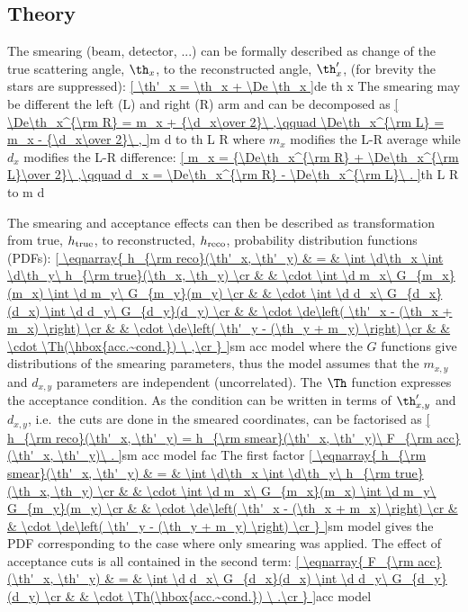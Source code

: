 \subsection{Theory}

\vskip3mm

The smearing (beam, detector, ...) can be formally described as change of the true scattering angle, $\th_x$, to the reconstructed angle, $\th'_x$, (for brevity the stars are suppressed):
\eqref{
\th'_x = \th_x + \De \th_x
}{de th x}
The smearing may be different the left (L) and right (R) arm and can be decomposed as
\eqref{
\De\th_x^{\rm R} = m_x + {\d_x\over 2}\ ,\qquad \De\th_x^{\rm L} = m_x - {\d_x\over 2}\ ,
}{m d to th L R}
where $m_x$ modifies the L-R average while $d_x$ modifies the L-R difference:
\eqref{
m_x = {\De\th_x^{\rm R} + \De\th_x^{\rm L}\over 2}\ ,\qquad d_x = \De\th_x^{\rm R} - \De\th_x^{\rm L}\ .
}{th L R to m d}

The smearing and acceptance effects can then be described as transformation from true, $h_{\rm true}$, to reconstructed, $h_{\rm reco}$, probability distribution functions (PDFs):
\eqref{
\eqnarray{
	h_{\rm reco}(\th'_x, \th'_y) & = & \int \d\th_x \int \d\th_y\ h_{\rm true}(\th_x, \th_y) \cr
								 &  & \cdot \int \d m_x\ G_{m_x}(m_x) \int \d m_y\ G_{m_y}(m_y) \cr
								 &  & \cdot \int \d d_x\ G_{d_x}(d_x) \int \d d_y\ G_{d_y}(d_y) \cr
								 &  & \cdot \de\left( \th'_x - (\th_x + m_x) \right) \cr
								 &  & \cdot \de\left( \th'_y - (\th_y + m_y) \right) \cr
								 &  & \cdot \Th(\hbox{acc.~cond.}) \ ,\cr
}
}{sm acc model}
where the $G$ functions give distributions of the smearing parameters, thus the model assumes that the $m_{x,y}$ and $d_{x,y}$ parameters are independent (uncorrelated). The $\Th$ function expresses the acceptance condition. As the condition can be written in terms of $\th'_{x,y}$ and $d_{x,y}$, i.e.~the cuts are done in the smeared coordinates,  can be factorised as
\eqref{
	h_{\rm reco}(\th'_x, \th'_y) = h_{\rm smear}(\th'_x, \th'_y)\ F_{\rm acc}(\th'_x, \th'_y)\ .
}{sm acc model fac}
The first factor
\eqref{
\eqnarray{
	h_{\rm smear}(\th'_x, \th'_y) & = & \int \d\th_x \int \d\th_y\ h_{\rm true}(\th_x, \th_y) \cr
								 &  & \cdot \int \d m_x\ G_{m_x}(m_x) \int \d m_y\ G_{m_y}(m_y) \cr
								 &  & \cdot \de\left( \th'_x - (\th_x + m_x) \right) \cr
								 &  & \cdot \de\left( \th'_y - (\th_y + m_y) \right) \cr
}
}{sm model}
gives the PDF corresponding to the case where only smearing was applied. The effect of acceptance cuts is all contained in the second term:
\eqref{
\eqnarray{
	F_{\rm acc}(\th'_x, \th'_y) & = & \int \d d_x\ G_{d_x}(d_x) \int \d d_y\ G_{d_y}(d_y) \cr
								 &  & \cdot \Th(\hbox{acc.~cond.}) \ .\cr
}
}{acc model}

